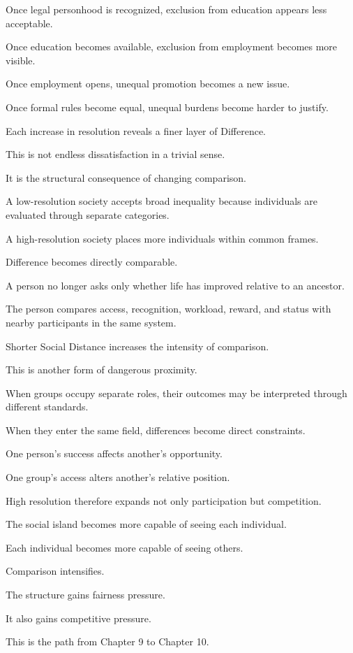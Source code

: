 Once legal personhood is recognized, exclusion from education appears less acceptable.

Once education becomes available, exclusion from employment becomes more visible.

Once employment opens, unequal promotion becomes a new issue.

Once formal rules become equal, unequal burdens become harder to justify.

Each increase in resolution reveals a finer layer of Difference.

This is not endless dissatisfaction in a trivial sense.

It is the structural consequence of changing comparison.

A low-resolution society accepts broad inequality because individuals are evaluated through separate categories.

A high-resolution society places more individuals within common frames.

Difference becomes directly comparable.

A person no longer asks only whether life has improved relative to an ancestor.

The person compares access, recognition, workload, reward, and status with nearby participants in the same system.

Shorter Social Distance increases the intensity of comparison.

This is another form of dangerous proximity.

When groups occupy separate roles, their outcomes may be interpreted through different standards.

When they enter the same field, differences become direct constraints.

One person’s success affects another’s opportunity.

One group’s access alters another’s relative position.

High resolution therefore expands not only participation but competition.

The social island becomes more capable of seeing each individual.

Each individual becomes more capable of seeing others.

Comparison intensifies.

The structure gains fairness pressure.

It also gains competitive pressure.

This is the path from Chapter 9 to Chapter 10.

